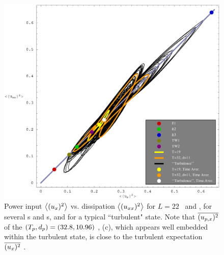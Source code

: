 \begin{figure}[t] \label{f:drivedrag}
\begin{center}
    \includegraphics[width=\textwidth]{figs/energyBalancePlot.eps}
\end{center}
\caption{
Power input $\left\langle {(u_{x})^2} \right\rangle$ vs.
dissipation $\left\langle {(u_{xx})^2} \right\rangle$ for $L=22$ \eqva\
and \reqva, for several
\po s and \rpo s, and for a typical ``turbulent"
state. Note that $\overline{(u_{p,x})^2}$
of the
$({T_{p}},d_p) =(32.8,10.96)$
 {\rpo}, (c), which appears well embedded
within the turbulent state, is close to the turbulent
expectation $\overline{(u_x)^2}$
.
        }
\end{figure}

